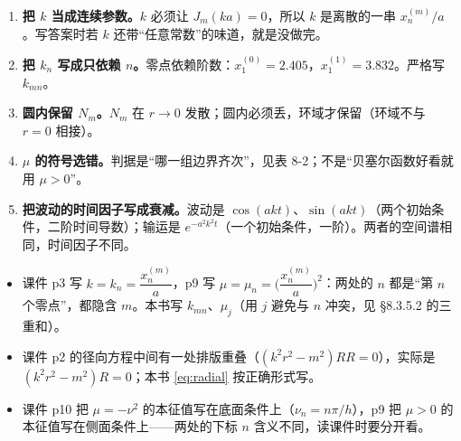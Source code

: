 
\begin{enumerate}[label=(\arabic*)]
  \item \textbf{把 $k$ 当成连续参数。}$k$ 必须让 $J_m(ka)=0$，所以 $k$ 是离散的一串 $x_n^{(m)}/a$。写答案时若 $k$ 还带“任意常数”的味道，就是没做完。
  \item \textbf{把 $k_n$ 写成只依赖 $n$。}零点依赖阶数：$x_1^{(0)}=2.405$，$x_1^{(1)}=3.832$。严格写 $k_{mn}$。
  \item \textbf{圆内保留 $N_m$。}$N_m$ 在 $r\to0$ 发散；圆内必须丢，环域才保留（环域不与 $r=0$ 相接）。
  \item \textbf{$\mu$ 的符号选错。}判据是“哪一组边界齐次”，见表 8-2；不是“贝塞尔函数好看就用 $\mu>0$”。
  \item \textbf{把波动的时间因子写成衰减。}波动是 $\cos(a kt)$、$\sin(a kt)$（两个初始条件，二阶时间导数）；输运是 $e^{-a^2k^2t}$（一个初始条件，一阶）。两者的空间谱相同，时间因子不同。
\end{enumerate}


\begin{itemize}
  \item 课件 p3 写 $k=k_n=\dfrac{x_n^{(m)}}{a}$，p9 写 $\mu=\mu_n=\Big(\dfrac{x_n^{(m)}}{a}\Big)^2$：两处的 $n$ 都是“第 $n$ 个零点”，都隐含 $m$。本书写 $k_{mn}$、$\mu_j$（用 $j$ 避免与 $n$ 冲突，见 \S8.3.5.2 的三重和）。
  \item 课件 p2 的径向方程中间有一处排版重叠（$(k^2r^2-m^2)RR=0$），实际是 $(k^2r^2-m^2)R=0$；本书 \eqref{eq:radial} 按正确形式写。
  \item 课件 p10 把 $\mu=-\nu^2$ 的本征值写在底面条件上（$\nu_n=n\pi/h$），p9 把 $\mu>0$ 的本征值写在侧面条件上——两处的下标 $n$ 含义不同，读课件时要分开看。
\end{itemize}


